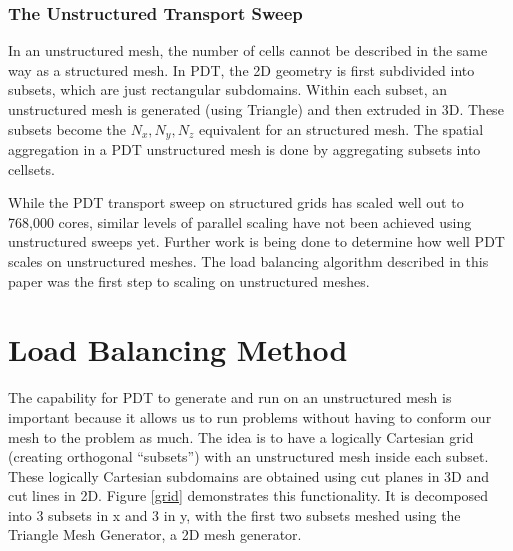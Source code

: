 \documentclass{anstrans}
\begin{document}
\subsubsection{The Unstructured Transport Sweep}
In an unstructured mesh, the number of cells cannot be described in the same way as a structured mesh. In PDT, the 2D
geometry is first subdivided into subsets, which are just rectangular subdomains. Within each subset, an unstructured mesh is generated (using Triangle) and then extruded in 3D. These subsets become the $N_x, N_y, N_z$ equivalent for an structured mesh. The spatial aggregation in a PDT unstructured mesh is done by aggregating subsets into cellsets. 

While the PDT transport sweep on structured grids has scaled well out to 768,000 cores, similar levels of parallel scaling have not been achieved using unstructured sweeps yet. Further work is being done to determine how well PDT scales on unstructured meshes. The load balancing algorithm described in this paper was the first step to scaling on unstructured meshes.

\section{Load Balancing Method}
The capability for PDT to generate and run on an unstructured mesh is important because it allows us to run problems without having to conform our mesh to the problem as much. The idea is to have a logically Cartesian grid (creating orthogonal ``subsets'') with an unstructured mesh inside each subset. These logically Cartesian subdomains are obtained using cut planes in 3D and cut lines in 2D. Figure \ref{grid} demonstrates this functionality. It is decomposed into 3 subsets in x and 3 in y, with the first two subsets meshed using the Triangle Mesh Generator\cite{triangle}, a 2D mesh generator.
\end{document}
